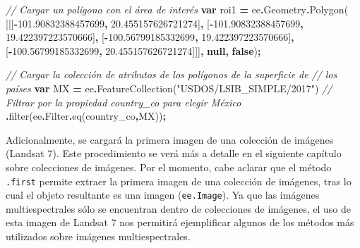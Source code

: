 \documentclass[
  12pt,
  letterpaper,
  twoside]{book}
\newenvironment{Shaded}{\begin{snugshade}}{\end{snugshade}}
\newcommand{\AttributeTok}[1]{\textcolor[rgb]{0.77,0.63,0.00}{#1}}
\newcommand{\CommentTok}[1]{\textcolor[rgb]{0.56,0.35,0.01}{\textit{#1}}}
\newcommand{\FloatTok}[1]{\textcolor[rgb]{0.00,0.00,0.81}{#1}}
\newcommand{\FunctionTok}[1]{\textcolor[rgb]{0.00,0.00,0.00}{#1}}
\newcommand{\KeywordTok}[1]{\textcolor[rgb]{0.13,0.29,0.53}{\textbf{#1}}}
\newcommand{\NormalTok}[1]{#1}
\newcommand{\OperatorTok}[1]{\textcolor[rgb]{0.81,0.36,0.00}{\textbf{#1}}}
\newcommand{\StringTok}[1]{\textcolor[rgb]{0.31,0.60,0.02}{#1}}
\begin{document}
\begin{Shaded}
\begin{Highlighting}[]
\CommentTok{// Cargar un polígono con el área de interés}
\KeywordTok{var}\NormalTok{ roi1 }\OperatorTok{=}\NormalTok{ ee}\OperatorTok{.}\AttributeTok{Geometry}\OperatorTok{.}\FunctionTok{Polygon}\NormalTok{(}
\NormalTok{        [[[}\OperatorTok{{-}}\FloatTok{101.90832388457699}\OperatorTok{,} \FloatTok{20.455157626721274}\NormalTok{]}\OperatorTok{,}
\NormalTok{          [}\OperatorTok{{-}}\FloatTok{101.90832388457699}\OperatorTok{,} \FloatTok{19.422397223570666}\NormalTok{]}\OperatorTok{,}
\NormalTok{          [}\OperatorTok{{-}}\FloatTok{100.56799185332699}\OperatorTok{,} \FloatTok{19.422397223570666}\NormalTok{]}\OperatorTok{,}
\NormalTok{          [}\OperatorTok{{-}}\FloatTok{100.56799185332699}\OperatorTok{,} \FloatTok{20.455157626721274}\NormalTok{]]]}\OperatorTok{,} \KeywordTok{null}\OperatorTok{,} \KeywordTok{false}\NormalTok{)}\OperatorTok{;}

\CommentTok{// Cargar la colección de atributos de los polígonos de la superficie de }
\CommentTok{// los países}
\KeywordTok{var}\NormalTok{ MX }\OperatorTok{=}\NormalTok{ ee}\OperatorTok{.}\FunctionTok{FeatureCollection}\NormalTok{(}\StringTok{"USDOS/LSIB\_SIMPLE/2017"}\NormalTok{)}
  \CommentTok{// Filtrar por la propiedad country\_co para elegir México}
  \OperatorTok{.}\FunctionTok{filter}\NormalTok{(ee}\OperatorTok{.}\AttributeTok{Filter}\OperatorTok{.}\FunctionTok{eq}\NormalTok{(}\StringTok{\textquotesingle{}country\_co\textquotesingle{}}\OperatorTok{,}\StringTok{\textquotesingle{}MX\textquotesingle{}}\NormalTok{))}\OperatorTok{;}
\end{Highlighting}
\end{Shaded}

Adicionalmente, se cargará la primera imagen de una colección de imágenes (Landsat 7). Este procedimiento se verá más a detalle en el siguiente capítulo sobre colecciones de imágenes. Por el momento, cabe aclarar que el método \texttt{.first} permite extraer la primera imagen de una colección de imágenes, tras lo cual el objeto resultante es una imagen (\texttt{ee.Image}). Ya que las imágenes multiespectrales sólo se encuentran dentro de colecciones de imágenes, el uso de esta imagen de Landsat 7 nos permitirá ejemplificar algunos de los métodos más utilizados sobre imágenes multiespectrales.
\end{document}
